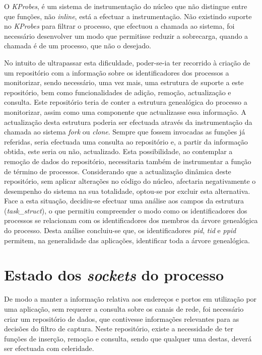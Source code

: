 O \textit{KProbes}, é um sistema de instrumentação do núcleo que não distingue entre que funções, não \textit{inline}, está a efectuar a instrumentação.
Não existindo suporte no \textit{KProbes} para filtrar o processo, que efectuou a chamada ao sistema, foi necessário desenvolver um modo que permitisse reduzir a sobrecarga, quando a chamada é de um processo, que não o desejado.

No intuito de ultrapassar esta dificuldade, poder-se-ia ter recorrido à criação de um repositório com a informação sobre os identificadores dos processos a monitorizar, sendo necessário, uma vez mais, uma estrutura de suporte a este repositório, bem como funcionalidades de adição, remoção, actualização e consulta.
Este repositório teria de conter a estrutura genealógica do processo a monitorizar, assim como uma componente que actualizasse essa informação.
A actualização desta estrutura poderia ser efectuada através da instrumentação da chamada ao sistema \textit{fork} ou \textit{clone}.
Sempre que fossem invocadas as funções já referidas, seria efectuada uma consulta ao repositório e, a partir da informação obtida, este seria ou não, actualizado.
Esta possibilidade, ao contemplar a remoção de dados do repositório, necessitaria também de instrumentar a função de término de processos.
Considerando que a actualização dinâmica deste repositório, sem aplicar alterações no código do núcleo, afectaria negativamente o desempenho do sistema na sua totalidade, optou-se por excluir esta alternativa.
Face a esta situação, decidiu-se efectuar uma análise aos campos da estrutura (\textit{task\_struct}), o que permitiu compreender o modo como os identificadores dos processos se relacionam com os identificadores dos membros da árvore genealógica do processo.
Desta análise concluiu-se que, os identificadores \textit{pid}, \textit{tid} e \textit{ppid} permitem, na generalidade das aplicações, identificar toda a árvore genealógica.

\section{Estado dos \textit{sockets} do processo}

De modo a manter a informação relativa aos endereços e portos em utilização por uma aplicação, sem requerer a consulta sobre os canais de rede, foi necessário criar um repositório de dados, que contivesse informações relevantes para as decisões do filtro de captura.
Neste repositório, existe a necessidade de ter funções de inserção, remoção e consulta, sendo que qualquer uma destas, deverá ser efectuada com celeridade.


